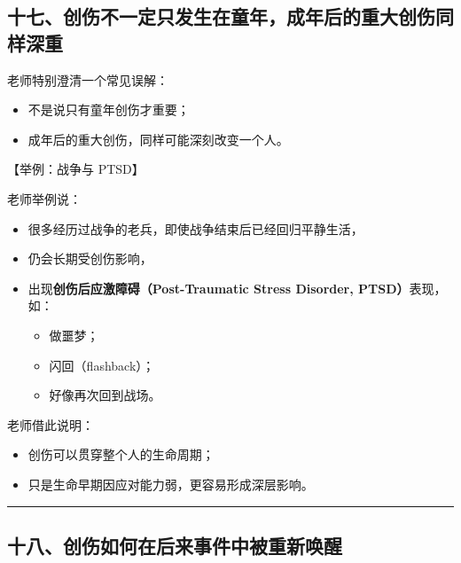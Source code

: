 \documentclass[
  chinese,
  9pt,
  a4paper,
]{ctexart}
\providecommand{\tightlist}{%
  \setlength{\itemsep}{0pt}\setlength{\parskip}{0pt}}
\begin{document}
\subsection{十七、创伤不一定只发生在童年，成年后的重大创伤同样深重}\label{ux5341ux4e03ux521bux4f24ux4e0dux4e00ux5b9aux53eaux53d1ux751fux5728ux7ae5ux5e74ux6210ux5e74ux540eux7684ux91cdux5927ux521bux4f24ux540cux6837ux6df1ux91cd}

老师特别澄清一个常见误解：

\begin{itemize}
\tightlist
\item
  不是说只有童年创伤才重要；
\item
  成年后的重大创伤，同样可能深刻改变一个人。
\end{itemize}

【举例：战争与 PTSD】

老师举例说：

\begin{itemize}
\item
  很多经历过战争的老兵，即使战争结束后已经回归平静生活，
\item
  仍会长期受创伤影响，
\item
  出现\textbf{创伤后应激障碍（Post-Traumatic Stress Disorder,
  PTSD）}表现，如：

  \begin{itemize}
  \tightlist
  \item
    做噩梦；
  \item
    闪回（flashback）；
  \item
    好像再次回到战场。
  \end{itemize}
\end{itemize}

老师借此说明：

\begin{itemize}
\tightlist
\item
  创伤可以贯穿整个人的生命周期；
\item
  只是生命早期因应对能力弱，更容易形成深层影响。
\end{itemize}

\begin{center}\rule{0.5\linewidth}{0.5pt}\end{center}

\subsection{十八、创伤如何在后来事件中被重新唤醒}\label{ux5341ux516bux521bux4f24ux5982ux4f55ux5728ux540eux6765ux4e8bux4ef6ux4e2dux88abux91cdux65b0ux5524ux9192}
\end{document}
